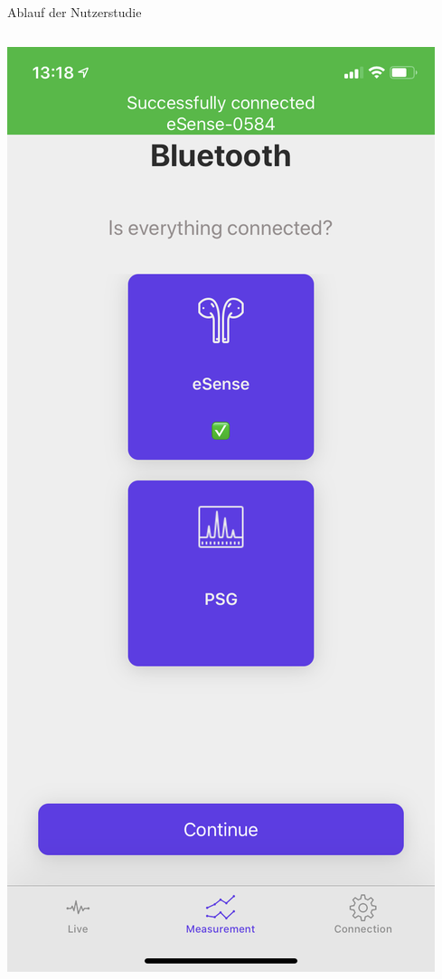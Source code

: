 \documentclass[18pt]{beamer}
\begin{document}
\begin{frame}{Ablauf der Nutzerstudie}
\begin{center}
\begin{columns}[T]
\begin{column}{.33\textwidth}
                \includegraphics[scale=0.1]{images/app/connect_success.PNG}
            \end{column}%
            \hfill%
            \begin{column}{.33\textwidth}

\end{column}
\end{columns}
\end{center}
\end{frame}
\end{document}

